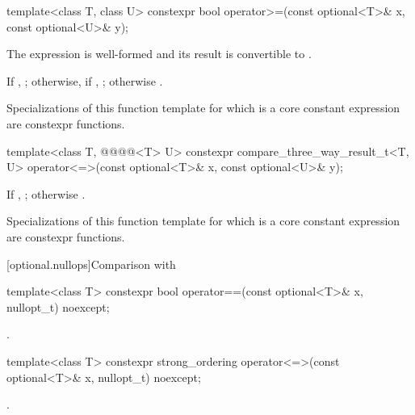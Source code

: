 %
\begin{itemdecl}
template<class T, class U>
  constexpr bool operator>=(const optional<T>& x, const optional<U>& y);
\end{itemdecl}

\begin{itemdescr}
\pnum
\constraints
The expression  is well-formed and its result is convertible to .

\pnum
\returns
If , ; otherwise, if , ; otherwise .

\pnum
\remarks
Specializations of this function template for which  is a core constant expression are constexpr functions.
\end{itemdescr}

%
\begin{itemdecl}
template<class T, @@@@<T> U>
  constexpr compare_three_way_result_t<T, U> operator<=>(const optional<T>& x, const optional<U>& y);
\end{itemdecl}

\begin{itemdescr}
\pnum
\returns
If , ; otherwise .

\pnum
\remarks
Specializations of this function template for which  is a core constant expression are constexpr functions.
\end{itemdescr}

[optional.nullops]{Comparison with }

%
\begin{itemdecl}
template<class T>
  constexpr bool operator==(const optional<T>& x, nullopt_t) noexcept;
\end{itemdecl}

\begin{itemdescr}
\pnum
\returns
{}.
\end{itemdescr}

%
\begin{itemdecl}
template<class T>
  constexpr strong_ordering operator<=>(const optional<T>& x, nullopt_t) noexcept;
\end{itemdecl}

\begin{itemdescr}
\pnum
\returns
{}.
\end{itemdescr}

